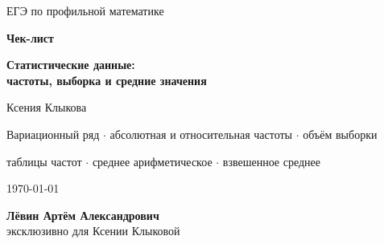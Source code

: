 \documentclass[a4paper,12pt]{article}
\begin{document}
\begin{titlepage}
\thispagestyle{empty}

\begin{center}

\vspace*{24mm}

{\large\color{softgray} ЕГЭ по профильной математике\par}

\vspace{18mm}

{\Huge\bfseries\color{darkaccent} Чек-лист\par}

\vspace{5mm}

{\LARGE\bfseries
Статистические данные:\\[2mm]
частоты, выборка и средние значения
\par}

\vspace{16mm}

{\large
Ксения Клыкова
\par}

\vspace{8mm}

{\normalsize
Вариационный ряд \(\cdot\)
абсолютная и относительная частоты \(\cdot\)
объём выборки
\par}

\vspace{3mm}

{\normalsize
таблицы частот \(\cdot\)
среднее арифметическое \(\cdot\)
взвешенное среднее
\par}

\vfill

{\large \today\par}

\vspace{10mm}

{\normalsize
\textbf{Лёвин Артём Александрович}\\[2mm]
эксклюзивно для Ксении Клыковой
\par}

\vspace{14mm}


\end{center}
\end{titlepage}
\end{document}
